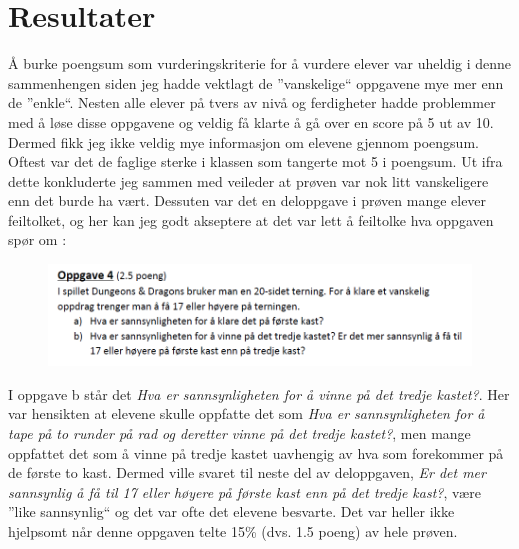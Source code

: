 \documentclass[main.tex]{subfiles}
\begin{document}
\section*{Resultater}
\label{sec:4}

Å burke poengsum som vurderingskriterie for å vurdere elever var uheldig i denne sammenhengen siden jeg hadde vektlagt
de ''vanskelige`` oppgavene mye mer enn de ''enkle``. Nesten alle elever på tvers av nivå og ferdigheter hadde 
problemmer med å løse disse oppgavene og veldig få klarte å gå over en score på 5 ut av 10. Dermed fikk jeg ikke 
veldig mye informasjon om elevene gjennom poengsum. Oftest var det de faglige sterke i klassen som tangerte
mot 5 i poengsum. Ut ifra dette konkluderte jeg sammen med veileder at prøven var nok litt vanskeligere enn
det burde ha vært. Dessuten var det en deloppgave i prøven mange elever feiltolket, og her kan jeg godt
akseptere at det var lett å feiltolke hva oppgaven spør om :
\par
\begin{figure}[h!]
\includegraphics[scale = 0.7]{../figures/oppgave4b.png}
\end{figure}
I oppgave b står det \emph{Hva er sannsynligheten for å vinne på det tredje kastet?}. Her var hensikten at
elevene skulle oppfatte det som \emph{Hva er sannsynligheten for å tape på to runder på rad og deretter vinne på det tredje kastet?},
men mange oppfattet det som å vinne på tredje kastet uavhengig av hva som forekommer på de første to kast.
Dermed ville svaret til neste del av deloppgaven, \emph{Er det mer sannsynlig å få til 17 eller høyere på første kast enn
på det tredje kast?},  være ''like sannsynlig`` og det var ofte det elevene besvarte. Det var heller ikke hjelpsomt når 
denne oppgaven telte 15\% (dvs. 1.5 poeng) av hele prøven.  
\end{document}
